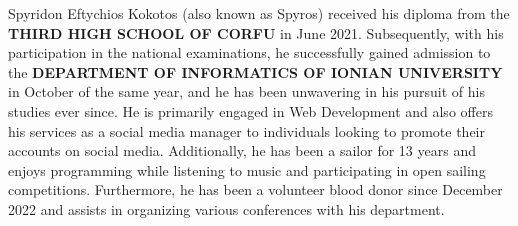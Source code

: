 

\begin{cvparagraph}

Spyridon Eftychios Kokotos (also known as Spyros) received his diploma from the \textbf{THIRD HIGH SCHOOL OF CORFU} in June 2021. Subsequently, with his participation in the national examinations, he successfully gained admission to the \textbf{DEPARTMENT OF INFORMATICS OF IONIAN UNIVERSITY} in October of the same year, and he has been unwavering in his pursuit of his studies ever since. He is primarily engaged in Web Development and also offers his services as a social media manager to individuals looking to promote their accounts on social media. Additionally, he has been a sailor for 13 years and enjoys programming while listening to music and participating in open sailing competitions. Furthermore, he has been a volunteer blood donor since December 2022 and assists in organizing various conferences with his department.
\end{cvparagraph}
